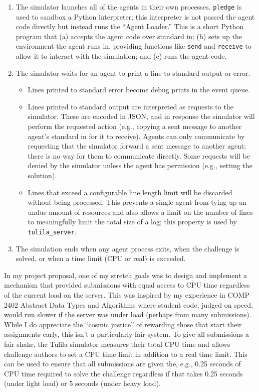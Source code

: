 \documentclass[12pt]{article}
\begin{document}
\begin{enumerate}
  \item The simulator launches all of the agents in their own processes. \texttt{pledge} is used to sandbox a Python interpreter; this interpreter is not passed the agent code directly but instead runs the ``Agent Loader.'' This is a short Python program that (a) accepts the agent code over standard in; (b) sets up the environment the agent runs in, providing functions like \texttt{send} and \texttt{receive} to allow it to interact with the simulation; and (c) runs the agent code.
  \item The simulator waits for an agent to print a line to standard output or error.
  \begin{itemize}[$\circ$]
    \item Lines printed to standard error become debug prints in the event queue.
    \item Lines printed to standard output are interpreted as requests to the simulator. These are encoded in JSON, and in response the simulator will perform the requested action (e.g., copying a sent message to another agent's standard in for it to receive). Agents can only communicate by requesting that the simulator forward a sent message to another agent; there is no way for them to communicate directly. Some requests will be denied by the simulator unless the agent has permission (e.g., setting the solution).
    \item Lines that exceed a configurable line length limit will be discarded without being processed. This prevents a single agent from tying up an undue amount of resources and also allows a limit on the number of lines to meaningfully limit the total size of a log; this property is used by \texttt{tulila\_server}.
  \end{itemize}
  \item The simulation ends when any agent process exits, when the challenge is solved, or when a time limit (CPU or real) is exceeded.
\end{enumerate}

In my project proposal, one of my stretch goals was to design and implement a mechanism that provided submissions with equal access to CPU time regardless of the current load on the server. This was inspired by my experience in COMP 2402 Abstract Data Types and Algorithms where student code, judged on speed, would run slower if the server was under load (perhaps from many submissions). While I do appreciate the ``cosmic justice'' of rewarding those that start their assignments early, this isn't a particularly fair system. To give all submissions a fair shake, the Tulila simulator measures their total CPU time and allows challenge authors to set a CPU time limit in addition to a real time limit. This can be used to ensure that all submissions are given the, e.g., 0.25 seconds of CPU time required to solve the challenge regardless if that takes 0.25 seconds (under light load) or 5 seconds (under heavy load).
\end{document}
